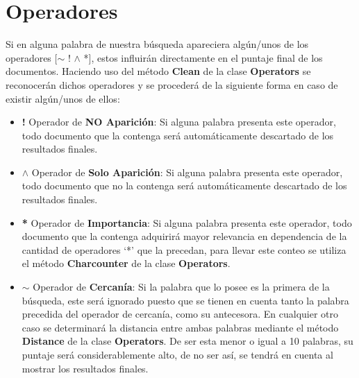 \documentclass{article}
\begin{document}
\section{Operadores}
Si en alguna palabra de nuestra búsqueda apareciera algún/unos de los operadores
	[$\sim $ ! $\wedge$ *], estos influirán directamente en el puntaje final de los documentos.
Haciendo uso del método \textbf{Clean} de la clase \textbf{Operators} se reconocerán dichos operadores y se
procederá de la siguiente forma en caso de existir algún/unos de ellos:
\begin{itemize}
	\item \textbf{!} Operador de \textbf{NO Aparición}: Si alguna palabra presenta este operador, todo documento que
	      la contenga será automáticamente descartado de los resultados finales.
	\item \textbf{$\wedge$} Operador de \textbf{Solo Aparición}: Si alguna palabra presenta este operador, todo documento que no
	      la contenga será automáticamente descartado de los resultados finales.
	\item \textbf{*} Operador de \textbf{Importancia}: Si alguna palabra presenta este operador, todo documento que
	      la contenga adquirirá mayor relevancia en dependencia de la cantidad de operadores ‘*’ que la
	      precedan, para llevar este conteo se utiliza el método \textbf{Charcounter} de la clase \textbf{Operators}.
	\item \textbf{$\sim $} Operador de \textbf{Cercanía}: Si la palabra que lo posee es la primera de
	      la búsqueda, este será ignorado puesto que se tienen en cuenta tanto la palabra
	      precedida del operador de cercanía, como su antecesora. En cualquier otro caso se
	      determinará la distancia entre ambas palabras mediante el método \textbf{Distance} de la
	      clase \textbf{Operators}. De ser esta menor o igual a 10 palabras, su puntaje será
	      considerablemente alto, de no ser así, se tendrá en cuenta al mostrar los
	      resultados finales.
\end{itemize}

\newpage
\end{document}
